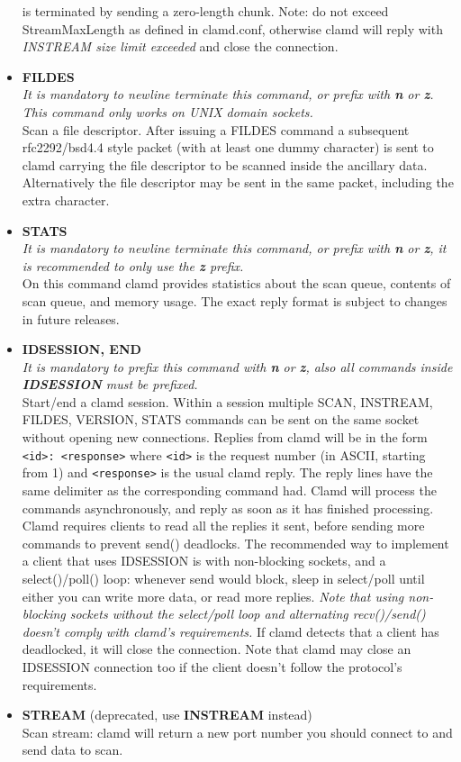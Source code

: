 \documentclass[a4paper,titlepage,12pt]{article}
\begin{document}
\begin{itemize}
	    is terminated by sending a zero-length chunk. Note: do not exceed
	    StreamMaxLength as defined in clamd.conf, otherwise clamd will
	    reply with \emph{INSTREAM size limit exceeded} and close the
	    connection.
	\item \textbf{FILDES}\\
	    \emph{It is mandatory to newline terminate this command, or prefix
	    with \textbf{n} or \textbf{z}. This command only works on UNIX
	    domain sockets.}\\
	    Scan a file descriptor. After issuing a FILDES command a subsequent
	    rfc2292/bsd4.4 style packet (with at least one dummy character) is
	    sent to clamd carrying the file descriptor to be scanned inside the
	    ancillary data. Alternatively the file descriptor may be sent in
	    the same packet, including the extra character.
	\item \textbf{STATS}\\
	    \emph{It is mandatory to newline terminate this command, or prefix
	    with \textbf{n} or \textbf{z}, it is recommended to only use the
	    \textbf{z} prefix.}\\
	    On this command clamd provides statistics about the scan queue,
	    contents of scan queue, and memory usage. The exact reply format is
	    subject to changes in future releases.
	\item \textbf{IDSESSION, END}\\
	    \emph{It is mandatory to prefix this command with \textbf{n} or
	    \textbf{z}, also all commands inside \textbf{IDSESSION} must be
	    prefixed.}\\
	    Start/end a clamd session. Within a session multiple
	    SCAN, INSTREAM, FILDES, VERSION, STATS commands can be sent on the
	    same socket without opening new connections. Replies from clamd
	    will be in the form \verb+<id>: <response>+ where \verb+<id>+ is
	    the request number (in ASCII, starting from 1) and \verb+<response>+
	    is the usual clamd reply. The reply lines have the same delimiter
	    as the corresponding command had. Clamd will process the commands
	    asynchronously, and reply as soon as it has finished processing.
	    Clamd requires clients to read all the replies it sent, before
	    sending more commands to prevent send() deadlocks. The recommended
	    way to implement a client that uses IDSESSION is with non-blocking
	    sockets, and a select()/poll() loop: whenever send would block,
	    sleep in select/poll until either you can write more data, or read
	    more replies. \emph{Note that using non-blocking sockets without
	    the select/poll loop and alternating recv()/send() doesn't comply
	    with clamd's requirements.} If clamd detects that a client has
	    deadlocked, it will close the connection. Note that clamd may
	    close an IDSESSION connection too if the client doesn't follow the
	    protocol's requirements.
	\item \textbf{STREAM} (deprecated, use \textbf{INSTREAM} instead)\\
	    Scan stream: clamd will return a new port number you should
	    connect to and send data to scan.
    \end{itemize}
\end{document}
